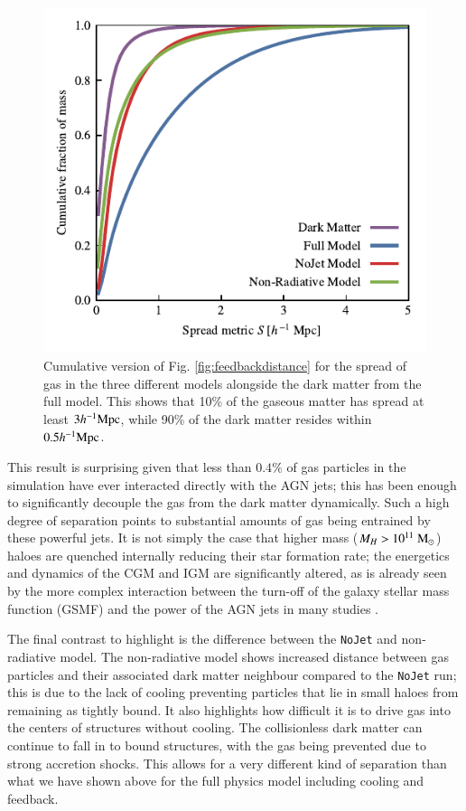 \documentclass[fleqn,usenatbib]{mnras}
\newcommand{\hmpc}{h^{-1}{\rm Mpc}}
\newcommand{\msolar}{\;{\rm M}_{\odot}}
\newcommand{\nojet}{{\tt NoJet}}
\begin{document}
\begin{figure}
    \centering
    \includegraphics{figures/cumulative_histogram_comparison.pdf}
    \vspace{-0.7cm}
    \caption{Cumulative version of Fig. \ref{fig:feedbackdistance} for the spread of gas
    in the three different models alongside the dark matter from the full model.
    This shows that 10\% of the gaseous matter has spread at least $3\hmpc{}$,
    while 90\% of the dark matter resides within $0.5 \hmpc{}$.}
    \label{fig:cumulativehistogram}
\end{figure}



This result is surprising given that less than $0.4\%$ of gas particles in
the simulation have ever interacted directly with the AGN jets; this has been
enough to significantly decouple the gas from the dark matter dynamically.
Such a high degree of separation points to substantial amounts of gas being
entrained by these powerful jets. It is not simply the case that higher mass
($M_H > 10^{11} \msolar{}$) haloes are quenched internally reducing their star
formation rate; the energetics and dynamics of the CGM and IGM are
significantly altered, as is already seen by the more complex interaction
between the turn-off of the galaxy stellar mass function (GSMF) and the power
of the AGN jets in many studies \citep{Weinberger2018, Dave2019}. 

The final contrast to highlight is the difference between the \nojet{} and
non-radiative model. The non-radiative model shows increased distance between
gas particles and their associated dark matter neighbour compared to the
\nojet{} run; this is due to the lack of cooling preventing particles that
lie in small haloes from remaining as tightly bound. It also highlights how
difficult it is to drive gas into the centers of structures without cooling.
The collisionless dark matter can continue to fall in to bound structures,
with the gas being prevented due to strong accretion shocks. This allows for
a very different kind of separation than what we have shown above for the
full physics model including cooling and feedback.
\end{document}
